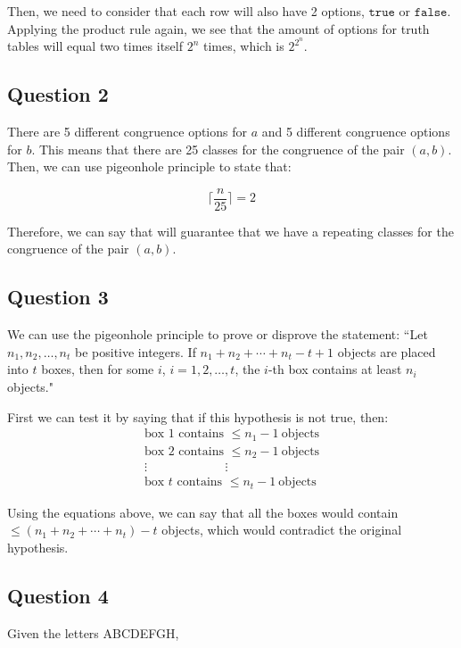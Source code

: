 \documentclass[letterpaper, 12pt]{article}
\begin{document}
Then, we need to consider that each row will also have 2 options, $\texttt{true}$ or $\texttt{false}$. Applying the product rule again, we see that the amount of options for truth tables will equal two times itself $2^n$ times, which is $2^{2^n}$.

\subsection*{Question 2}
There are 5 different congruence options for $a$ and 5 different congruence options for $b$. This means that there are 25 classes for the congruence of the pair $(a, b)$. Then, we can use pigeonhole principle to state that:

\[\Big\lceil\frac{n}{25}\Big\rceil = 2\]

Therefore, we can say that  will guarantee that we have a repeating classes for the congruence of the pair $(a, b)$.

\subsection*{Question 3}
We can use the pigeonhole principle to prove or disprove the statement: ``Let $n_1,n_2,\ldots,n_t$ be positive integers. If $n_1 + n_2 + \cdots + n_t - t + 1$ objects are placed into $t$ boxes, then for some $i$, $i = 1,2,\ldots,t$, the $i$-th box contains at least $n_i$ objects."

First we can test it by saying that if this hypothesis is not true, then:
\begin{gather*}
    \text{box 1 contains } \leq n_1 - 1\ \text{objects}\\
    \text{box 2 contains } \leq n_2 - 1\ \text{objects}\\
    \vdots\hspace{75pt}\vdots\\
    \text{box $t$ contains } \leq n_t - 1\ \text{objects}
\end{gather*}

Using the equations above, we can say that all the boxes would contain $\leq (n_1 + n_2 + \cdots + n_t) - t$ objects, which would contradict the original hypothesis.

\subsection*{Question 4}
Given the letters ABCDEFGH,
\end{document}
